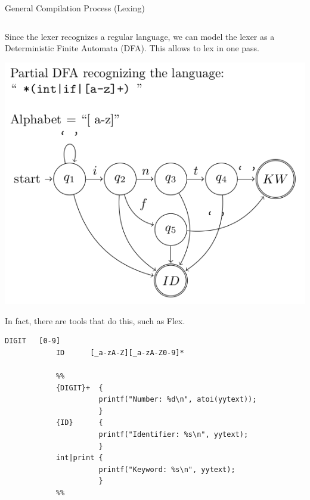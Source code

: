 \documentclass{beamer}
\begin{document}
\begin{frame}[fragile]{General Compilation Process (Lexing)}
\begin{columns}[T,onlytextwidth]
        \begin{overprint}
            Since the lexer recognizes a regular language, we can model the lexer as a Deterministic Finite Automata (DFA). This allows to lex in one pass.

            \centering
            \includegraphics[scale=0.4]{images/lexer_dfa.png}

            In fact, there are tools that do this, such as Flex.

            \begin{lstlisting}[gobble=12,escapeinside=~]
            DIGIT   [0-9]
            ID      [_a-zA-Z][_a-zA-Z0-9]*

            %%
            {DIGIT}+  {
                      printf("Number: %d\n", atoi(yytext));
                      }
            {ID}      {
                      printf("Identifier: %s\n", yytext);
                      }
            int|print {
                      printf("Keyword: %s\n", yytext);
                      }
            %%
            \end{lstlisting}
        \end{overprint}


\end{columns}
\end{frame}
\end{document}
